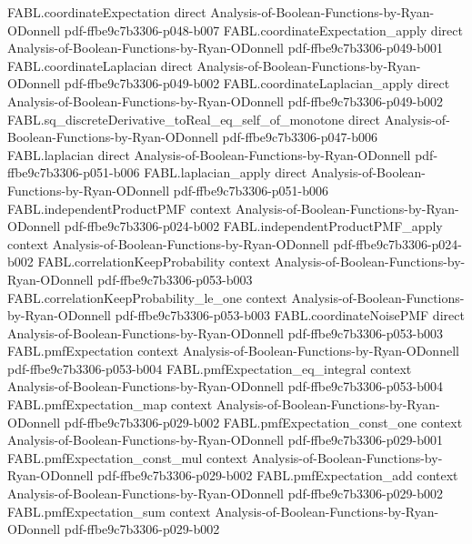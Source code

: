 \begin{theorem}
\proofstep
  {FABL.coordinateExpectation}
  {direct}
  {Analysis-of-Boolean-Functions-by-Ryan-ODonnell}
  {pdf-ffbe9c7b3306-p048-b007}
\proofstep
  {FABL.coordinateExpectation_apply}
  {direct}
  {Analysis-of-Boolean-Functions-by-Ryan-ODonnell}
  {pdf-ffbe9c7b3306-p049-b001}
\proofstep
  {FABL.coordinateLaplacian}
  {direct}
  {Analysis-of-Boolean-Functions-by-Ryan-ODonnell}
  {pdf-ffbe9c7b3306-p049-b002}
\proofstep
  {FABL.coordinateLaplacian_apply}
  {direct}
  {Analysis-of-Boolean-Functions-by-Ryan-ODonnell}
  {pdf-ffbe9c7b3306-p049-b002}
\proofstep
  {FABL.sq_discreteDerivative_toReal_eq_self_of_monotone}
  {direct}
  {Analysis-of-Boolean-Functions-by-Ryan-ODonnell}
  {pdf-ffbe9c7b3306-p047-b006}
\proofstep
  {FABL.laplacian}
  {direct}
  {Analysis-of-Boolean-Functions-by-Ryan-ODonnell}
  {pdf-ffbe9c7b3306-p051-b006}
\proofstep
  {FABL.laplacian_apply}
  {direct}
  {Analysis-of-Boolean-Functions-by-Ryan-ODonnell}
  {pdf-ffbe9c7b3306-p051-b006}
\proofstep
  {FABL.independentProductPMF}
  {context}
  {Analysis-of-Boolean-Functions-by-Ryan-ODonnell}
  {pdf-ffbe9c7b3306-p024-b002}
\proofstep
  {FABL.independentProductPMF_apply}
  {context}
  {Analysis-of-Boolean-Functions-by-Ryan-ODonnell}
  {pdf-ffbe9c7b3306-p024-b002}
\proofstep
  {FABL.correlationKeepProbability}
  {context}
  {Analysis-of-Boolean-Functions-by-Ryan-ODonnell}
  {pdf-ffbe9c7b3306-p053-b003}
\proofstep
  {FABL.correlationKeepProbability_le_one}
  {context}
  {Analysis-of-Boolean-Functions-by-Ryan-ODonnell}
  {pdf-ffbe9c7b3306-p053-b003}
\proofstep
  {FABL.coordinateNoisePMF}
  {direct}
  {Analysis-of-Boolean-Functions-by-Ryan-ODonnell}
  {pdf-ffbe9c7b3306-p053-b003}
\proofstep
  {FABL.pmfExpectation}
  {context}
  {Analysis-of-Boolean-Functions-by-Ryan-ODonnell}
  {pdf-ffbe9c7b3306-p053-b004}
\proofstep
  {FABL.pmfExpectation_eq_integral}
  {context}
  {Analysis-of-Boolean-Functions-by-Ryan-ODonnell}
  {pdf-ffbe9c7b3306-p053-b004}
\proofstep
  {FABL.pmfExpectation_map}
  {context}
  {Analysis-of-Boolean-Functions-by-Ryan-ODonnell}
  {pdf-ffbe9c7b3306-p029-b002}
\proofstep
  {FABL.pmfExpectation_const_one}
  {context}
  {Analysis-of-Boolean-Functions-by-Ryan-ODonnell}
  {pdf-ffbe9c7b3306-p029-b001}
\proofstep
  {FABL.pmfExpectation_const_mul}
  {context}
  {Analysis-of-Boolean-Functions-by-Ryan-ODonnell}
  {pdf-ffbe9c7b3306-p029-b002}
\proofstep
  {FABL.pmfExpectation_add}
  {context}
  {Analysis-of-Boolean-Functions-by-Ryan-ODonnell}
  {pdf-ffbe9c7b3306-p029-b002}
\proofstep
  {FABL.pmfExpectation_sum}
  {context}
  {Analysis-of-Boolean-Functions-by-Ryan-ODonnell}
  {pdf-ffbe9c7b3306-p029-b002}

\end{theorem}
